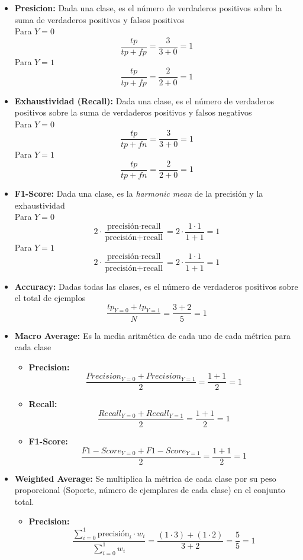 \begin{itemize}
    \item \textbf{Presicion:} Dada una clase, es el número de verdaderos positivos sobre la suma de verdaderos positivos y falsos positivos \\
    Para $Y=0$ 
    \[\frac{tp}{tp + fp} = \frac{3}{3 + 0} = 1\] 
    Para $Y=1$
    \[\frac{tp}{tp + fp} = \frac{2}{2 + 0} = 1\]

    \item \textbf{Exhaustividad (Recall):} Dada una clase, es el número de verdaderos positivos sobre la suma de verdaderos positivos y falsos negativos \\
    Para $Y=0$
    \[\frac{tp}{tp+fn} = \frac{3}{3+0} = 1\]
    Para $Y=1$
    \[\frac{tp}{tp+fn} = \frac{2}{2+0} = 1\]

    \item \textbf{F1-Score:} Dada una clase, es la \textit{harmonic mean} de la precisión y la exhaustividad \\
    Para $Y=0$
    \[2 \cdot \frac{\text{precisión} \cdot \text{recall}}{\text{precisión} + \text{recall}} = 2 \cdot \frac{1 \cdot 1}{1 + 1} = 1\]
    Para $Y=1$
    \[2 \cdot \frac{\text{precisión} \cdot \text{recall}}{\text{precisión} + \text{recall}} = 2 \cdot \frac{1 \cdot 1}{1 + 1} = 1\]

    \item \textbf{Accuracy:} Dadas todas las clases, es el número de verdaderos positivos sobre el total de ejemplos
    \[\frac{tp_{Y=0} + tp_{Y=1} }{N}= \frac{3 + 2}{5} = 1\]
    
    \item \textbf{Macro Average:} Es la media aritmética de cada uno de cada métrica para cada clase
    \begin{itemize}
        \item \textbf{Precision:} \[\frac{Precision_{Y=0} + Precision_{Y=1}}{2} = \frac{1 + 1}{2} = 1\]
        \item \textbf{Recall:} \[\frac{Recall_{Y=0} + Recall_{Y=1}}{2} = \frac{1 + 1}{2} = 1\]
        \item \textbf{F1-Score:} \[\frac{F1-Score_{Y=0} + F1-Score_{Y=1}}{2} = \frac{1 + 1}{2} = 1\]
    \end{itemize}
    
    \item \textbf{Weighted Average:} Se multiplica la métrica de cada clase por su peso proporcional (Soporte, número de ejemplares de cada clase) en el conjunto total.
        \begin{itemize}
            \item \textbf{Precision:} \[\frac{\sum_{i=0}^{1} \text{precisión}_i \cdot w_i }{\sum_{i=0}^{1} w_i} = \frac{(1 \cdot 3) + (1 \cdot 2)}{3 + 2} = \frac{5}{5} = 1\]
            

\end{itemize}
\end{itemize}
